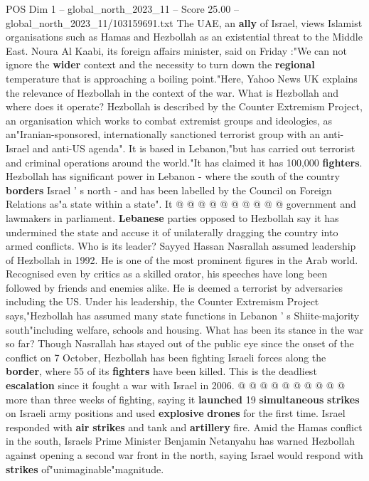 \begin{textsample}{POS Dim 1 – global\_north\_2023\_11 – Score 25.00 – global\_north\_2023\_11/103159691.txt}  \label{ex:f1_pos_351}
The UAE, an \textbf{ally} of Israel, views Islamist organisations such as Hamas and Hezbollah as an existential threat to the Middle East.
Noura Al Kaabi, its foreign affairs minister, said on Friday :"We can not ignore the \textbf{wider} context and the necessity to turn down the \textbf{regional} temperature that is approaching a boiling point."Here, Yahoo News UK explains the relevance of Hezbollah in the context of the war.
What is Hezbollah and where does it operate?
Hezbollah is described by the Counter Extremism Project, an organisation which works to combat extremist groups and ideologies, as an"Iranian-sponsored, internationally sanctioned terrorist group with an anti-Israel and anti-US agenda".
It is based in Lebanon,"but has carried out terrorist and criminal operations around the world."It has claimed it has 100,000 \textbf{fighters}.
Hezbollah has significant power in Lebanon - where the south of the country \textbf{borders} Israel ' s north - and has been labelled by the Council on Foreign Relations as"a state within a state".
It @ @ @ @ @ @ @ @ @ @ government and lawmakers in parliament. \textbf{Lebanese} parties opposed to Hezbollah say it has undermined the state and accuse it of unilaterally dragging the country into armed conflicts.
Who is its leader?
Sayyed Hassan Nasrallah assumed leadership of Hezbollah in 1992.
He is one of the most prominent figures in the Arab world.
Recognised even by critics as a skilled orator, his speeches have long been followed by friends and enemies alike.
He is deemed a terrorist by adversaries including the US.
Under his leadership, the Counter Extremism Project says,"Hezbollah has assumed many state functions in Lebanon ' s Shiite-majority south"including welfare, schools and housing.
What has been its stance in the war so far?
Though Nasrallah has stayed out of the public eye since the onset of the conflict on 7 October, Hezbollah has been fighting Israeli forces along the \textbf{border}, where 55 of its \textbf{fighters} have been killed.
This is the deadliest \textbf{escalation} since it fought a war with Israel in 2006. @ @ @ @ @ @ @ @ @ @ more than three weeks of fighting, saying it \textbf{launched} 19 \textbf{simultaneous} \textbf{strikes} on Israeli army positions and used \textbf{explosive} \textbf{drones} for the first time.
Israel responded with \textbf{air} \textbf{strikes} and tank and \textbf{artillery} fire.
Amid the Hamas conflict in the south, Israels Prime Minister Benjamin Netanyahu has warned Hezbollah against opening a second war front in the north, saying Israel would respond with \textbf{strikes} of"unimaginable"magnitude.

\end{textsample}
